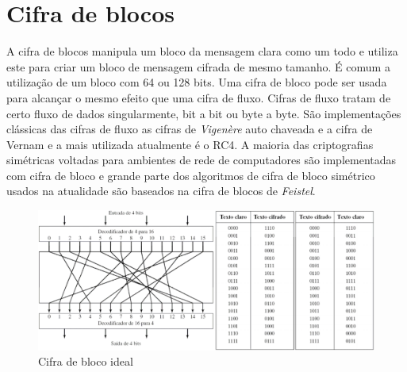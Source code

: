 \section{Cifra de blocos}
\label{sec:cifradeblocos}
A cifra de blocos manipula um bloco da mensagem clara como um todo e utiliza este para criar um bloco de mensagem cifrada de mesmo tamanho. É comum a utilização de um bloco com 64 ou 128 bits. Uma cifra de bloco pode ser usada para alcançar o mesmo efeito que uma cifra de fluxo. Cifras de fluxo tratam de certo fluxo de dados singularmente, bit a bit ou byte a byte. São implementações clássicas das cifras de fluxo as cifras de \textit{Vigenère} auto chaveada e a cifra de Vernam e a mais utilizada atualmente é o RC4. A maioria das criptografias simétricas voltadas para ambientes de rede de computadores são implementadas com cifra de bloco e grande parte dos algoritmos de cifra de bloco simétrico usados na atualidade são baseados na cifra de blocos de \textit{Feistel}.


\begin{figure}[H]
    \centering
    \caption{Cifra de bloco ideal}
    \label{fig:cifrablocoideal}
    \includegraphics[width=.8\linewidth]{Figuras/CifraDeBloco.png}
\end{figure}

